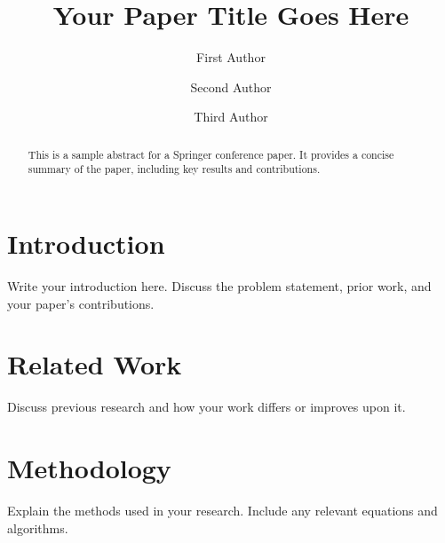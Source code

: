 \documentclass[runningheads]{llncs}
\begin{document}
\title{Your Paper Title Goes Here}


\author{First Author \and
Second Author \and
Third Author}



\maketitle

\begin{abstract}
This is a sample abstract for a Springer conference paper. It provides a concise summary of the paper, including key results and contributions.
\end{abstract}

\section{Introduction}
Write your introduction here. Discuss the problem statement, prior work, and your paper’s contributions.

\section{Related Work}
Discuss previous research and how your work differs or improves upon it.

\section{Methodology}
Explain the methods used in your research. Include any relevant equations and algorithms.
\end{document}
